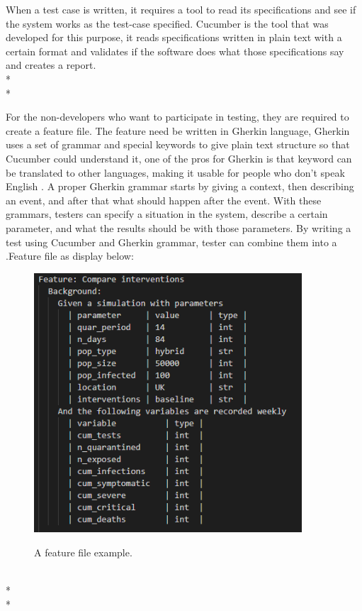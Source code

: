 When a test case is written, it requires a tool to read its specifications and see if the system works as the test-case specified. Cucumber is the tool that was developed for this purpose, it reads specifications written in plain text with a certain format and validates if the software does what those specifications say \cite{Reference9} and creates a report. \\*\\*

For the non-developers who want to participate in testing, they are required to create a feature file. The feature need be written in Gherkin language, Gherkin uses a set of grammar and special keywords to give plain text structure so that Cucumber could understand it, one of the pros for Gherkin is that keyword can be translated to other languages, making it usable for people who don’t speak English \cite{Reference10}. A proper Gherkin grammar starts by giving a context, then describing an event, and after that what should happen after the event. With these grammars, testers can specify a situation in the system, describe a certain parameter, and what the results should be with those parameters. By writing a test using Cucumber and Gherkin grammar, tester can combine them into a .Feature file as display below: 
\begin{figure}[h]
	\centering
	\includegraphics[width=10cm]{figures/featureFile.png}\\
	\caption{A feature file example.}
	\label{fig:figure1}
\end{figure}
\newpage \noindent 
\\*\\*

